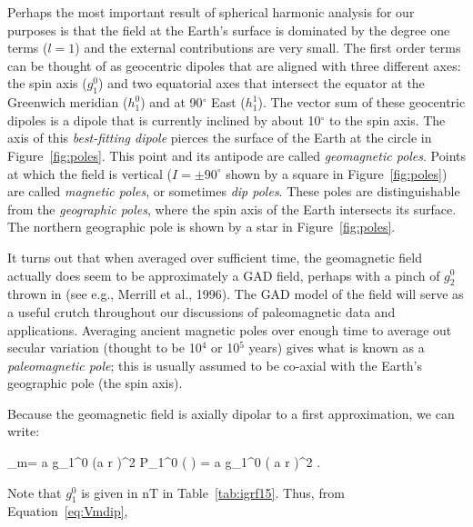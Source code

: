 Perhaps the most important result of
%
spherical harmonic analysis for our purposes is that the field at the Earth's surface is dominated
by the degree one terms ($l=1$) and the external contributions are very
small.
  The first order terms can be thought of as geocentric dipoles that are aligned
with three different axes: the spin axis ($g_1^0$) and two equatorial axes 
that intersect the equator at the Greenwich meridian 
($h_1^0$) and at 90$^{\circ}$ East ($h_1^1$).               
%
%
The vector sum of these geocentric dipoles  is a dipole that is currently
 inclined by about 10$^{\circ}$ to the spin axis.  The
axis of this {\it best-fitting dipole} pierces the surface of the Earth at the circle in
Figure~\ref{fig:poles}.  This point and its antipode are called
 {\it geomagnetic poles}.  Points at which the field
is vertical ($I = \pm 90^{\circ}$ shown by a square in Figure~\ref{fig:poles}) are called  
{\it magnetic poles}, or sometimes 
%
%
%
%
{\it dip poles}.  These poles are distinguishable from the {\it geographic poles},
  where the spin axis of the Earth intersects its surface.
The northern geographic pole is shown by a star in Figure~\ref{fig:poles}.

%
%
It turns out that when averaged over sufficient time, the geomagnetic field  actually does seem  to be  approximately  a GAD field, perhaps with a pinch of $g_2^0$ thrown in
 \nocite{merrill96}
 (see e.g., Merrill et al., 1996). 
The GAD model of the field will serve as a useful crutch 
throughout our discussions of
paleomagnetic data and applications. 
Averaging ancient magnetic poles over enough time to average out secular variation (thought to be  10$^4$ or 10$^5$ years)  gives what is known
as a 
%
{\it paleomagnetic pole}; this  is usually assumed to be co-axial with the Earth's geographic pole (the spin axis).  


Because the geomagnetic field is axially dipolar 
to a  first approximation, we can write:

\beq \psi_m= {a }g_1^0 \left({a \over r} \right)^2 P_1^0 ( \cos \theta ) = {a } g_1^0
\left( {a \over r} \right)^2 \cos \theta.
\label{eq:Vmdip}
\eeq

 Note that $g_1^0$ is given in nT in Table~\ref{tab:igrf15}.    Thus, from Equation~\ref{eq:Vmdip}, 

